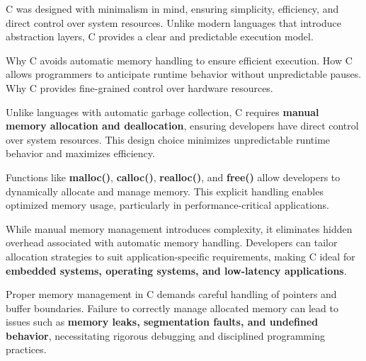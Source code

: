 \begin{NxSSSBox}
	\begin{NxIDBox}
		C was designed with minimalism in mind, ensuring simplicity, efficiency, and direct control over system resources. Unlike modern languages that introduce abstraction layers, C provides a clear and predictable execution model.
	\end{NxIDBox}
	\begin{NxIDBoxL}
		 Why C avoids automatic memory handling to ensure efficient execution.
		 How C allows programmers to anticipate runtime behavior without unpredictable pauses.
		 Why C provides fine-grained control over hardware resources.
	\end{NxIDBoxL}
\end{NxSSSBox}

\begin{NxSSSSBox}
	\begin{NxIDBox}
		Unlike languages with automatic garbage collection, C requires \textbf{manual memory allocation and deallocation}, ensuring developers have direct control over system resources. This design choice minimizes unpredictable runtime behavior and maximizes efficiency.
	\end{NxIDBox}
	\begin{NxIDBox}
		Functions like \textbf{malloc()}, \textbf{calloc()}, \textbf{realloc()}, and \textbf{free()} allow developers to dynamically allocate and manage memory. This explicit handling enables optimized memory usage, particularly in performance-critical applications.
	\end{NxIDBox}
	\begin{NxIDBox}
		While manual memory management introduces complexity, it eliminates hidden overhead associated with automatic memory handling. Developers can tailor allocation strategies to suit application-specific requirements, making C ideal for \textbf{embedded systems, operating systems, and low-latency applications}.
	\end{NxIDBox}
	\begin{NxIDBox}
		Proper memory management in C demands careful handling of pointers and buffer boundaries. Failure to correctly manage allocated memory can lead to issues such as \textbf{memory leaks, segmentation faults, and undefined behavior}, necessitating rigorous debugging and disciplined programming practices.
	\end{NxIDBox}
\end{NxSSSSBox}

